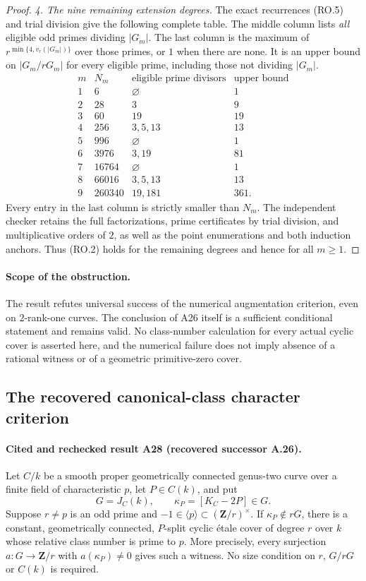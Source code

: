 \documentclass[11pt,a4paper]{article}
\begin{document}
\begin{proof}
\emph{4. The nine remaining extension degrees.}
The exact recurrences (RO.5) and trial division give the
following complete table.  The middle column lists
\emph{all} eligible odd primes dividing $|G_m|$.
The last column is the maximum of
$r^{\min\{4,v_r(|G_m|)\}}$ over those primes, or $1$
when there are none.  It is an upper bound on
$|G_m/rG_m|$ for every eligible prime, including those
not dividing $|G_m|$.
\[
\begin{array}{c|r|l|r}
m&N_m&\text{eligible prime divisors}&\text{upper bound}\\
\hline
1&6&\varnothing&1\\
2&28&3&9\\
3&60&19&19\\
4&256&3,5,13&13\\
5&996&\varnothing&1\\
6&3976&3,19&81\\
7&16764&\varnothing&1\\
8&66016&3,5,13&13\\
9&260340&19,181&361.
\end{array}
\tag{RO.13}
\]
Every entry in the last column is strictly smaller than
$N_m$.  The independent checker retains the full
factorizations, prime certificates by trial division,
and multiplicative orders of $2$, as well as the
point enumerations and both induction anchors.
Thus (RO.2) holds for the remaining degrees and hence
for all $m\ge1$.
\end{proof}

\paragraph{Scope of the obstruction.}
The result refutes universal success of the numerical
augmentation criterion, even on $2$-rank-one curves.
The conclusion of A26 itself is a sufficient conditional
statement and remains valid.
No class-number calculation for every actual cyclic
cover is asserted here, and the numerical failure does
not imply absence of a rational witness or of a geometric
primitive-zero cover.


\subsection{The recovered canonical-class character criterion}
\label{sec:recovered-canonical-character}

\paragraph{Cited and rechecked result A28 (recovered successor A.26).}
Let $C/k$ be a smooth proper geometrically connected genus-two
curve over a finite field of characteristic $p$, let $P\in C(k)$,
and put
\[
             G=J_C(k),\qquad\kappa_P=[K_C-2P]\in G.
\tag{RC.1}
\]
Suppose $r\ne p$ is an odd prime and
$-1\in\langle p\rangle\subset(\mathbf Z/r)^\times$.
If $\kappa_P\notin rG$, there is a constant, geometrically
connected, $P$-split cyclic \'etale cover of degree $r$
over $k$ whose relative class number is prime to $p$.
More precisely, every surjection $a:G\to\mathbf Z/r$
with $a(\kappa_P)\ne0$ gives such a witness.
No size condition on $r$, $G/rG$ or $C(k)$ is required.
\end{document}
